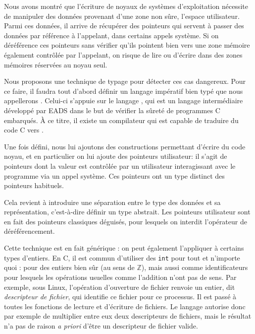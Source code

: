 
Nous avons montré que l'écriture de noyaux de systèmes d'exploitation nécessite
de manipuler des données provenant d'une zone non sûre, l'espace utilisateur.
Parmi ces données, il arrive de récupérer des pointeurs qui servent à passer des
données par référence à l'appelant, dans certains appels système. Si on
déréférence ces pointeurs sans vérifier qu'ils pointent bien vers une zone
mémoire également contrôlée par l'appelant, on risque de lire ou d'écrire dans
des zones mémoires réservées au noyau seul.

Nous proposons une technique de typage pour détecter ces cas dangereux. Pour ce
faire, il faudra tout d'abord définir un langage impératif bien typé que nous
appellerons \langname.
Celui-ci s'appuie sur le langage \newspeak, qui est un langage intermédiaire
développé par EADS dans le but de vérifier la sûreté de programmes C embarqués.
À ce titre, il existe un compilateur qui est capable de traduire du code C vers
\newspeak.

Une fois \langname défini, nous lui ajoutons des constructions permettant
d'écrire du code noyau, et en particulier on lui ajoute des pointeurs
utilisateur: il s'agit de pointeurs dont la valeur est contrôlée par un
utilisateur interagissant avec le programme via un appel système. Ces pointeurs
ont un type distinct des pointeurs habituels.

Cela revient à introduire une séparation entre le type des données et sa
représentation, c'est-à-dire définir un type abstrait. Les pointeurs
utilisateur sont en fait des pointeurs classiques déguisés, pour lesquels on
interdit l'opérateur de déréférencement.

Cette technique est en fait générique : on peut également l'appliquer à certains
types d'entiers. En C, il est commun d'utiliser des \texttt{int} pour tout et
n'importe quoi : pour des entiers bien sûr (au sens de $ℤ$), mais aussi comme
identificateurs pour lesquels les opérations usuelles comme l'addition n'ont pas
de sens. Par exemple, sous Linux, l'opération d'ouverture de fichier renvoie un
entier, dit \emph{descripteur de fichier}, qui identifie ce fichier pour ce
processus. Il est passé à toutes les fonctions de lecture et d'écriture de
fichiers.
Le langage autorise donc par exemple de multiplier entre
eux deux descripteurs de fichiers, mais le résultat n'a pas de raison \emph{a
priori} d'être un descripteur de fichier valide.



